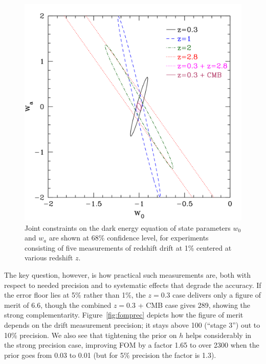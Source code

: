 \documentclass[preprint2, 10pt]{aastex}
\begin{document}
\begin{figure}[!htbp] 
   \centering
  \includegraphics[width=\columnwidth]{w0wazpluscmb.pdf}
\caption{Joint constraints on the dark energy equation of state parameters 
$w_0$ and $w_a$ are shown at 68\% confidence level, for experiments 
consisting of five measurements of redshift drift at 1\% centered at 
various redshift $z$. 
} 
\label{fig:fisher} 
\end{figure}


The key question, however, is how practical such measurements are, both 
with respect to needed precision and to systematic effects that degrade 
the accuracy. If the error floor lies at 5\% rather than 1\%, the $z=0.3$ 
case delivers only a figure of merit of 6.6, though the combined $z=0.3$ + 
CMB case gives 289, showing the strong complementarity. 
Figure~\ref{fig:fomprec} depicts how the figure of merit depends on the 
drift measurement precision; it stays above 100 (``stage 3'') out to 10\% 
precision. We also see that tightening the prior on $h$ helps considerably 
in the strong precision case, improving FOM by a factor 1.65 to over 2300 
when the prior goes from 0.03 to 0.01 (but for 5\% precision the factor is 
1.3). 
\end{document}
